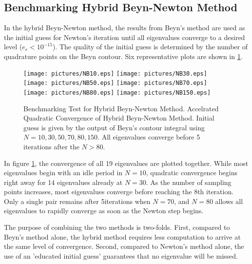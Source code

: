 \documentclass[final,leqno,onefignum,onetabnum]{siamltex1213}
\begin{document}
\subsection{Benchmarking Hybrid Beyn-Newton Method}
In the hybrid Beyn-Newton method, the results from Beyn's method are used as the initial guess for Newton's iteration until all eigenvalues converge to a desired level ($e_r<10^{-15}$). The quality of the initial guess is determined by the number of quadrature points on the Beyn contour. Six representative plots are shown in \ref{fig:BeynNewton}. 
\begin{figure}\label{fig:BeynNewton}
\begin{center}
\texttt{[image: pictures/NB10.eps]}
\texttt{[image: pictures/NB30.eps]}
\texttt{[image: pictures/NB50.eps]}
\texttt{[image: pictures/NB70.eps]}
\texttt{[image: pictures/NB80.eps]}
\texttt{[image: pictures/NB150.eps]}
\end{center}
\caption{Benchmarking Test for Hybrid Beyn-Newton Method. \textnormal{Accelrated Quadratic Convergence of Hybrid Beyn-Newton Method. Initial guess is given by the output of Beyn's contour integral using $N=10,30,50,70,80,150$. All eigenvalues converge before 5 iterations after the $N>80$.}}
\end{figure}
In figure \ref{fig:BeynNewton}, the convergence of all 19 eigenvalues are plotted together. While most eigenvalues begin with an idle period in $N=10$, quadratic convergence begins right away for 14 eigenvalues already at $N=30$.
As the number of sampling points increases, most eigenvalues converge before reaching the 8th iteration. Only a single pair remains after 5iterations when $N=70$, and $N=80$ allows all eigenvalues to rapidly converge as soon as the Newton step begins. 

The purpose of combining the two methods is two-folds. First, compared to Beyn's method alone, the hybrid method requires less computation to arrive at the same level of convergence. Second, compared to Newton's method alone, the use of an 'educated initial guess' guarantees that no eigenvalue will be missed. 

\end{document}
